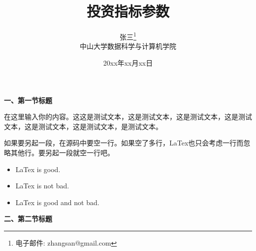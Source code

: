 \documentclass[a4paper, 12pt]{ctexart}
\title{投资指标参数}
\author{张三\footnote{电子邮件: zhangsan@gmail.com}\\[2ex]
\xiaosihao 中山大学数据科学与计算机学院\\[2ex]
}
\date{20xx年xx月xx日}
\newcommand{\sihao}{\fontsize{14pt}{\baselineskip}\selectfont}
\newcommand{\xiaosihao}{\fontsize{12pt}{\baselineskip}\selectfont}
\begin{document}
\maketitle             %
\setcounter{page}{0}
\thispagestyle{empty}

\newpage               %

\hspace{-2em}\textbf{\sihao 一、第一节标题}

在这里输入你的内容。这这是测试文本，这是测试文本，这是测试文本，这是测试文本，这是测试文本，这是测试文本，是测试文本。

如果要另起一段，在源码中要空一行。如果空了多行，LaTex也只会考虑一行而忽略其他行。要另起一段就空一行吧。

\vspace{-3ex}     %
\begin{itemize}\setlength{\itemindent}{1em}\setlength{\itemsep}{0.3ex}
    \item LaTex is good.
    \item LaTex is not bad.
    \item LaTex is good and not bad.
\end{itemize}

\vspace{2ex}
\hspace{-2em}\textbf{\sihao 二、第二节标题}
\end{document}
